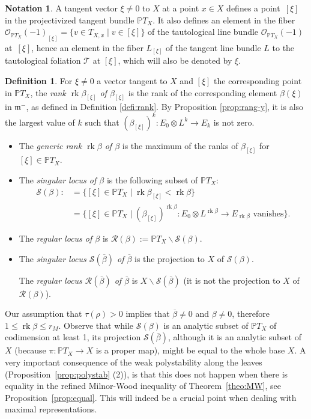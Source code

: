\documentclass[10pt]{amsart}
\let\mathcal\mathscr
\theoremstyle{plain}
\theoremstyle{definition}
\newtheorem{defi}[theo]{Definition}
\newtheorem{nota}[theo]{Notation}
\let\ov\overline
\DeclareMathOperator{\rk}{rk}
\newcommand{\cR}{\mathcal{R}}
\newcommand{\cS}{\mathcal{S}}
\newcommand{\cT}{\mathcal{T}}
\newcommand{\PTX}{{\mathbb{P}T_X}}
\newcommand{\OX}{\mathcal{O}_{\PTX}(-1)}
\newcommand{\fm}{\mathfrak{m}}
\newcommand{\rkm}{{r_M}}
\newcommand{\ovb}{\ov{\beta}}
\begin{document}
\begin{nota}
A tangent vector $\xi\neq 0$ to $X$ at a point $x\in X$ defines a point~$[\xi]$ in the
projectivized tangent bundle $\PTX$. It also defines an element
in the fiber ${\OX}_{[\xi]}=\{v\in T_{X,x}\mid v\in[\xi]\}$ of the tautological line bundle $\OX$
at~$[\xi]$, hence an element in the fiber $L_{[\xi]}$ of the tangent line bundle $L$ to the
tautological foliation $\cT$ at
$[\xi]$, which will also be denoted by $\xi$.
\end{nota}

\begin{defi}
\label{defi:rg-beta}
For $\xi\neq 0$ a vector tangent to $X$ and $[\xi]$ the corresponding point in $\PTX$,
the \emph{rank $\rk\beta_{[\xi]}$ of $\beta_{[\xi]}$} is the rank of the
corresponding element $\beta(\xi)$
in $\fm^-$, as defined in Definition \ref{defi:rank}.
By Proposition \ref{prop:rang-y}, it is also the largest value of $k$
such that $(\beta_{[\xi]})^k:E_0\otimes L^{k}\to E_{k}$ is not zero.

\begin{itemize}
\item
The \emph{generic rank $\rk\beta$
of $\beta$} is the maximum of the ranks of $\beta_{[\xi]}$ for $[\xi]\in\PTX$.

\item
The \emph{singular locus of $\beta$} is the following subset of $\PTX$:
\begin{align*}
\cS(\beta): &=\{[\xi]\in\PTX\mid
\rk\beta_{[\xi]}<\rk\beta\}\\
&=\{[\xi]\in\PTX\mid (\beta_{[\xi]})^{\rk\beta}: E_0\otimes L^{\rk\beta}\rightarrow E_{\rk\beta}\mbox{ vanishes}\}.
\end{align*}

\item
The \emph{regular locus of $\beta$} is $\cR(\beta):=\PTX\backslash\cS(\beta)$.

\item
The \emph{singular locus $\cS(\ovb)$ of $\ovb$} is the projection to $X$ of $\cS(\beta)$.

The \emph{regular locus $\cR(\ovb)$ of $\ovb$} is $X\backslash\cS(\ovb)$ (it is not the
projection to $X$ of ${\cR}(\beta)$).

\end{itemize}
\end{defi}

Our assumption that $\tau(\rho)\!>\!0$ implies that $\ovb\!\neq\!0$ and $\beta\!\neq\!0$, therefore
\hbox{$1\leq \rk\beta\leq\rkm$}.
Observe that while $\cS(\beta)$
is an analytic subset of $\PTX$ of codimension at least 1,
its projection $\cS(\ovb)$, although
it is an analytic subset of $X$ (because
$\pi:\PTX\to X$ is a proper map), might be equal to the whole base $X$. A very important
consequence of the
weak polystability along the
leaves (Proposition~\ref{prop:polystab} (2)), is that this does not happen when there is equality
in the refined Milnor-Wood inequality of Theorem~\ref{theo:MW}, see
Proposition~\ref{prop:equal}. This will indeed be a crucial point when dealing with maximal
representations.
\end{document}
